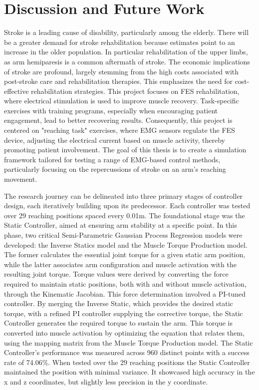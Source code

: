 \chapter{Discussion and Future Work}

Stroke is a leading cause of disability, particularly among the elderly. There will be a greater demand for stroke rehabilitation because estimates point to an increase in the older population. In particular rehabilitation of the upper limbs, as arm hemiparesis is a common aftermath of stroke. The economic implications of stroke are profound, largely stemming from the high costs associated with post-stroke care and rehabilitation therapies. This emphasizes the need for cost-effective rehabilitation strategies. This project focuses on FES rehabilitation, where electrical stimulation is used to improve muscle recovery. Task-specific exercises with training programs, especially when encouraging patient engagement, lead to better recovering results. Consequently, this project is centered on "reaching task" exercises, where EMG sensors regulate the FES device, adjusting the electrical current based on muscle activity, thereby promoting patient involvement. The goal of this thesis is to create a simulation framework tailored for testing a range of EMG-based control methods, particularly focusing on the repercussions of stroke on an arm's reaching movement.

The research journey can be delineated into three primary stages of controller design, each iteratively building upon its predecessor. Each controller was tested over 29 reaching positions spaced every 0.01m. The foundational stage was the Static Controller, aimed at ensuring arm stability at a specific point. In this phase, two critical Semi-Parametric Gaussian Process Regression models were developed: the Inverse Statics model and the Muscle Torque Production model. The former calculates the essential joint torque for a given static arm position, while the latter associates arm configuration and muscle activation with the resulting joint torque. Torque values were derived by converting the force required to maintain static positions, both with and without muscle activation, through the Kinematic Jacobian. This force determination involved a PI-tuned controller. By merging the Inverse Static, which provides the desired static torque, with a refined PI controller supplying the corrective torque, the Static Controller generates the required torque to sustain the arm. This torque is converted into muscle activation by optimizing the equation that relates them, using the mapping matrix from the Muscle Torque Production model. The Static Controller's performance was measured across 960 distinct points with a success rate of 74.06\%. When tested over the 29 reaching positions the Static Controller maintained the position with minimal variance. It showcased high accuracy in the x and z coordinates, but slightly less precision in the y coordinate.


